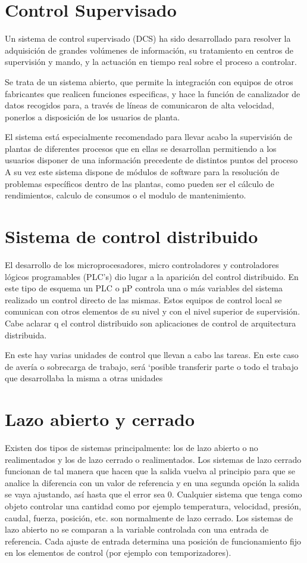 \section{Control Supervisado}
Un sistema de control supervisado (DCS) ha sido desarrollado para resolver la
adquisición de grandes volúmenes de información, su tratamiento en centros
de supervisión y mando, y la actuación en tiempo real sobre el proceso a
controlar.

Se trata de un sistema abierto, que permite la integración con equipos de otros
fabricantes que realicen funciones especificas, y hace la función de canalizador
de datos recogidos para, a través de líneas de comunicaron de alta velocidad,
ponerlos a disposición de los usuarios de planta.

El sistema está especialmente recomendado para llevar acabo la supervisión de
plantas de diferentes procesos que en ellas se desarrollan permitiendo a los
usuarios disponer de una información precedente de distintos puntos del proceso
A su vez este sistema dispone de módulos de software para la resolución de
problemas específicos dentro de las plantas, como pueden ser el cálculo de
rendimientos, calculo de consumos o el modulo de mantenimiento.

\section{Sistema de control distribuido}

El desarrollo de los microprocesadores, micro controladores y controladores
lógicos programables (PLC’s) dio lugar a la aparición del control distribuido.
En este tipo de esquema un PLC o µP controla una o más variables del sistema
realizado un control directo de las mismas. Estos equipos de control local se
comunican con otros elementos de su nivel y con el nivel superior de
supervisión. Cabe aclarar q el control distribuido son aplicaciones de control
de arquitectura distribuida.

En este hay varias unidades de control que llevan a cabo las tareas. En este
caso de avería o sobrecarga de trabajo, será `posible transferir parte o todo
el trabajo que desarrollaba la misma a otras unidades

\section{Lazo abierto y cerrado}

Existen dos tipos de sistemas principalmente: los de lazo abierto o no
realimentados y los de lazo cerrado o realimentados. Los sistemas de lazo
cerrado funcionan de tal manera que hacen que la salida vuelva al principio para
que se analice la diferencia con un valor de referencia y en una segunda opción
la salida se vaya ajustando, así hasta que el error sea 0. Cualquier sistema que
tenga como objeto controlar una cantidad como por ejemplo temperatura,
velocidad, presión, caudal, fuerza, posición, etc. son normalmente de lazo
cerrado. Los sistemas de lazo abierto no se comparan a la variable controlada
con una entrada de referencia. Cada ajuste de entrada determina una posición de
funcionamiento fijo en los elementos de control (por ejemplo con temporizadores).

